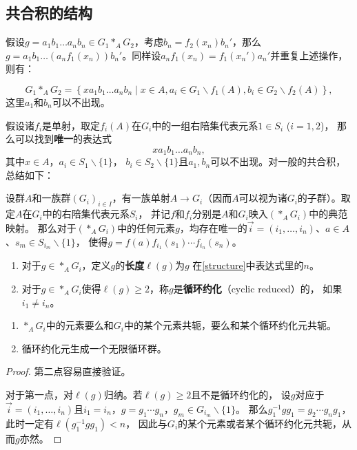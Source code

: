 \subsection{共合积的结构}
假设$g = a_1b_1\ldots a_nb_n \in G_1*_A G_2$，考虑$b_n = f_2(x_n)b_n'$，那么
$g = a_1b_1 \ldots (a_nf_1(x_n))b_n'$。同样设$a_nf_1(x_n) = f_1(x_n')a_n'$并重复上述操作，则有：
\begin{proposition}
    \[G_1*_A G_2 = \left\{ xa_1b_1\ldots a_nb_n \mid x \in A,a_i \in G_1\backslash f_1(A),b_i \in G_2\backslash f_2(A) \right\},\]
    这里$a_1$和$b_n$可以不出现。
\end{proposition}

假设诸$f_i$是单射，取定$f_i(A)$在$G_i$中的一组右陪集代表元系$1 \in S_i$ ($i = 1,2$)，
那么可以找到\textbf{唯一}的表达式\[xa_1b_1\ldots a_nb_n,\]其中$x \in A$，$a_i \in S_1\backslash\{1\}$，
$b_i \in S_2 \backslash \{1\}$且$a_1,b_n$可以不出现。对一般的共合积，总结如下：
\begin{theorem}\label{structure}
    设群$A$和一族群$(G_i)_{i \in I}$，有一族单射$A \to G_i$（因而$A$可以视为诸$G_i$的子群）。取定$A$在$G_i$中的右陪集代表元系$S_i$，
    并记$f$和$f_i$分别是$A$和$G_i$映入$(*_A G_i)$中的典范映射。
    那么对于$(*_A G_i)$中的任何元素$g$，均存在唯一的$\vec{i} = (i_1,\ldots,i_n)$、$a \in A$、$s_m \in S_{i_m}\backslash\{1\}$，
    使得$g = f(a)f_{i_1}(s_1)\cdots f_{i_n}(s_n)$。
\end{theorem}
\begin{definition}
    \begin{enumerate}
        \item 对于$g \in *_A G_i$，定义$g$的\textbf{长度}$\ell(g)$为$g$
        在\ref{structure}中表达式里的$n$。
        \item 对于$g \in *_A G_i$使得$\ell(g) \geqslant 2$，称$g$是\textbf{循环约化}（cyclic reduced）的，
        如果$i_1 \neq i_n$。
    \end{enumerate}
\end{definition}
\begin{proposition}
    \begin{enumerate}
        \item $*_A G_i$中的元素要么和$G_i$中的某个元素共轭，要么和某个循环约化元共轭。
        \item 循环约化元生成一个无限循环群。
    \end{enumerate}
\end{proposition}
\begin{proof}
    第二点容易直接验证。

    对于第一点，对$\ell(g)$归纳。若$\ell(g) \geqslant 2$且不是循环约化的，
    设$g$对应于$\vec{i} = (i_1,\ldots,i_n)$且$i_1 = i_n$，$g = g_1\cdots g_n$，$g_m \in G_{i_m}\backslash \{1\}$。
    那么$g_1^{-1}gg_1 = g_2 \cdots g_ng_1$，此时一定有$\ell(g_1^{-1}gg_1) < n$，
    因此与$G_i$的某个元素或者某个循环约化元共轭，从而$g$亦然。
\end{proof}
